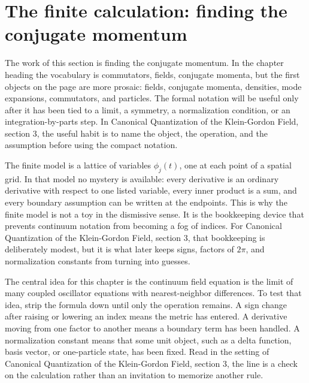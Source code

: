 \section{The finite calculation: finding the conjugate momentum}













The work of this section is finding the conjugate momentum.  In the chapter heading the vocabulary is commutators, fields, conjugate momenta, but the first objects on the page are more prosaic: fields, conjugate momenta, densities, mode expansions, commutators, and particles.  The formal notation will be useful only after it has been tied to a limit, a symmetry, a normalization condition, or an integration-by-parts step.  In Canonical Quantization of the Klein-Gordon Field, section 3, the useful habit is to name the object, the operation, and the assumption before using the compact notation.

The finite model is a lattice of variables \(\phi_j(t)\), one at each point of a spatial grid.  In that model no mystery is available: every derivative is an ordinary derivative with respect to one listed variable, every inner product is a sum, and every boundary assumption can be written at the endpoints.  This is why the finite model is not a toy in the dismissive sense.  It is the bookkeeping device that prevents continuum notation from becoming a fog of indices.  For Canonical Quantization of the Klein-Gordon Field, section 3, that bookkeeping is deliberately modest, but it is what later keeps signs, factors of \(2\pi\), and normalization constants from turning into guesses.

The central idea for this chapter is the continuum field equation is the limit of many coupled oscillator equations with nearest-neighbor differences.  To test that idea, strip the formula down until only the operation remains.  A sign change after raising or lowering an index means the metric has entered.  A derivative moving from one factor to another means a boundary term has been handled.  A normalization constant means that some unit object, such as a delta function, basis vector, or one-particle state, has been fixed.  Read in the setting of Canonical Quantization of the Klein-Gordon Field, section 3, the line is a check on the calculation rather than an invitation to memorize another rule.

